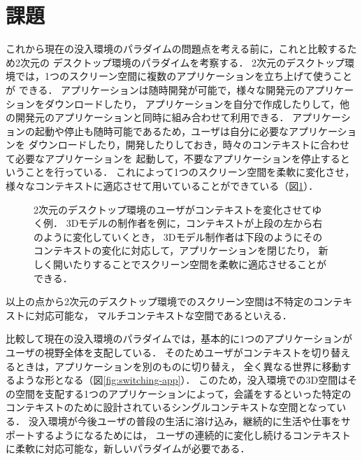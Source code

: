 \section{課題}
\label{section:intro:problem}

これから現在の没入環境のパラダイムの問題点を考える前に，これと比較するため2次元の
デスクトップ環境のパラダイムを考察する．
2次元のデスクトップ環境では，1つのスクリーン空間に複数のアプリケーションを立ち上げて使うことが
できる．
アプリケーションは随時開発が可能で，様々な開発元のアプリケーションをダウンロードしたり，
アプリケーションを自分で作成したりして，他の開発元のアプリケーションと同時に組み合わせて利用できる．
アプリケーションの起動や停止も随時可能であるため，ユーザは自分に必要なアプリケーションを
ダウンロードしたり，開発したりしておき，時々のコンテキストに合わせて必要なアプリケーションを
起動して，不要なアプリケーションを停止するということを行っている．
これによって1つのスクリーン空間を柔軟に変化させ，
様々なコンテキストに適応させて用いていることができている（図\ref{fig:context-switch}）．

\begin{figure}[htbp]
  \centering
  \caption{
    2次元のデスクトップ環境のユーザがコンテキストを変化させてゆく例．
    3Dモデルの制作者を例に，コンテキストが上段の左から右のように変化していくとき，
    3Dモデル制作者は下段のようにそのコンテキストの変化に対応して，アプリケーションを閉じたり，
    新しく開いたりすることでスクリーン空間を柔軟に適応させることができる．
  }
  \label{fig:context-switch}
\end{figure}

以上の点から2次元のデスクトップ環境でのスクリーン空間は不特定のコンテキストに対応可能な，
マルチコンテキストな空間であるといえる．

比較して現在の没入環境のパラダイムでは，基本的に1つのアプリケーションがユーザの視野全体を支配している．
そのためユーザがコンテキストを切り替えるときは，アプリケーションを別のものに切り替え，
全く異なる世界に移動するような形となる（図\ref{fig:switching-app}）．
このため，没入環境での3D空間はその空間を支配する1つのアプリケーションによって，会議をするといった特定の
コンテキストのために設計されているシングルコンテキストな空間となっている．
没入環境が今後ユーザの普段の生活に溶け込み，継続的に生活や仕事をサポートするようになるためには，
ユーザの連続的に変化し続けるコンテキストに柔軟に対応可能な，新しいパラダイムが必要である．

